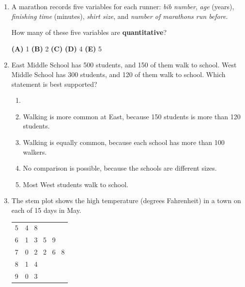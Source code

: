 \documentclass[12pt]{article}
\begin{document}
\begin{enumerate}[leftmargin=1.9em, itemsep=0.13in]

  \boxguard[8]
  \item A marathon records five variables for each runner: \emph{bib number}, \emph{age}
        (years), \emph{finishing time} (minutes), \emph{shirt size}, and \emph{number of
        marathons run before}.

        How many of these five variables are \textbf{quantitative}?\hfill{}\rule[-0.2in]{0pt}{0.48in}
        \par\vspace{3pt}\noindent
        \hspace{1.2em}\textbf{(A)} 1 \hfill \textbf{(B)} 2 \hfill
        \textbf{(C)}  \hfill \textbf{(D)} 4 \hfill \textbf{(E)} 5

  \boxguard[11]
  \item East Middle School has 500 students, and 150 of them walk to school. West Middle
        School has 300 students, and 120 of them walk to school. Which statement is best
        supported?
        \begin{enumerate}[label=\textbf{(\Alph*)}, leftmargin=2.2em, itemsep=2pt]
          \item {}\\
          \item Walking is more common at East, because 150 students is more than 120 students.
          \item Walking is equally common, because each school has more than 100 walkers.
          \item No comparison is possible, because the schools are different sizes.
          \item Most West students walk to school.\hfill{}\rule[-0.2in]{0pt}{0.48in}
        \end{enumerate}

  \boxguard[13]
  \item The stem plot shows the high temperature (degrees Fahrenheit) in a town on each of
        15 days in May.

        \vspace{3pt}
        {\centering\small
        \renewcommand{\arraystretch}{1.05}
        \begin{tabular}{@{} r | l @{}}
        5 & 4 \ 8 \\
        6 & 1 \ 3 \ 5 \ 9 \\
        7 & 0 \ 2 \ 2 \ 6 \ 8 \\
        8 & 1 \ 4 \\
        9 & 0 \ 3 \\
        \end{tabular}\qquad
        \par}
        \vspace{2pt}


\end{enumerate}
\end{document}
